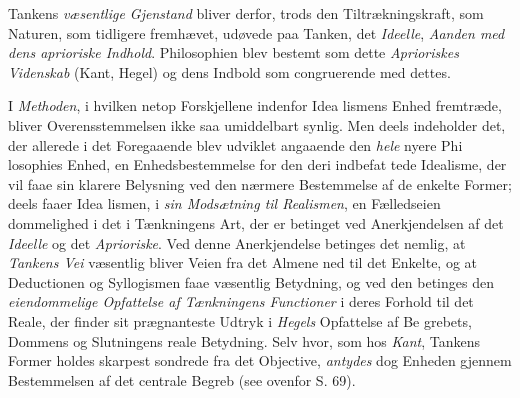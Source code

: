 Tankens \emph{væsentlige Gjenstand} bliver derfor, trods
den Tiltrækningskraft, som Naturen, som tidligere fremhævet,
udøvede paa Tanken, det \emph{Ideelle}, \emph{Aanden med dens
aprioriske Indhold}. Philosophien blev bestemt som dette
 \emph{Aprioriskes Videnskab} (Kant, Hegel) og dens Indbold
som congruerende med dettes.

I \emph{Methoden}, i hvilken netop Forskjellene indenfor Idea\-%
lismens Enhed fremtræde, bliver Overensstemmelsen ikke saa
umiddelbart synlig. Men deels indeholder det, der allerede i
det Foregaaende blev udviklet angaaende den \emph{hele} nyere Phi\-%
losophies Enhed, en Enhedsbestemmelse for den deri indbefat\-%
tede Idealisme, der vil faae sin klarere Belysning ved den
nærmere Bestemmelse af de enkelte Former; deels faaer Idea\-%
lismen, i \emph{sin Modsætning til Realismen}, en Fælledseien\-%
dommelighed i det i Tænkningens Art, der er betinget ved
Anerkjendelsen af det \emph{Ideelle} og det \emph{Aprioriske}. Ved
denne Anerkjendelse betinges det nemlig, at \emph{Tankens Vei}
væsentlig bliver Veien fra det Almene ned til det Enkelte, og
at Deductionen og Syllogismen faae væsentlig Betydning, og
ved den betinges den \emph{eiendommelige Opfattelse af
Tænkningens Functioner} i deres Forhold til det Reale,
der finder sit prægnanteste Udtryk i \emph{Hegels} Opfattelse af Be\-%
grebets, Dommens og Slutningens reale Betydning. Selv hvor,
som hos \emph{Kant}, Tankens Former holdes skarpest sondrede fra
det Objective, \emph{antydes} dog Enheden gjennem Bestemmelsen
af det centrale Begreb (see ovenfor S. 69).

